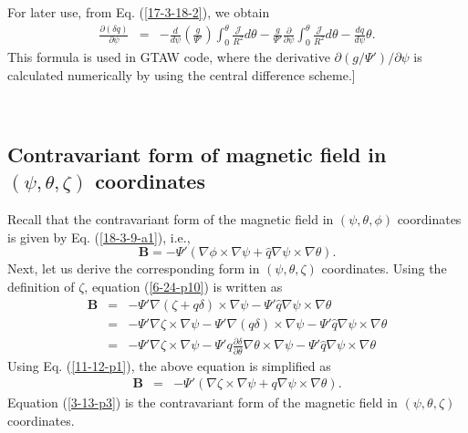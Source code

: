 \documentclass{llncs}
\begin{document}
For later use, from Eq. (\ref{17-3-18-2}), we obtain
\begin{eqnarray}
  \frac{\partial (\delta q)}{\partial \psi} & = & - \frac{d}{d \psi} \left(
  \frac{g}{\Psi'} \right) \int_0^{\theta} \frac{\mathcal{J}}{R^2} d \theta -
  \frac{g}{\Psi'}  \frac{\partial}{\partial \psi} \int_0^{\theta}
  \frac{\mathcal{J}}{R^2} d \theta - \frac{d q}{d \psi} \theta . 
  \label{6-25-a1}
\end{eqnarray}
This formula is used in GTAW code, where the derivative $\partial (g / \Psi')
/ \partial \psi$ is calculated numerically by using the central difference
scheme.]

\

\subsection{ Contravariant form of magnetic field in $(\psi, \theta, \zeta)$
coordinates}\label{6-25-4}

Recall that the contravariant form of the magnetic field in $(\psi, \theta,
\phi)$ coordinates is given by Eq. (\ref{18-3-9-a1}), i.e.,
\begin{equation}
  \label{6-24-p10} \mathbf{B}= - \Psi' (\nabla \phi \times \nabla \psi +
  \hat{q} \nabla \psi \times \nabla \theta) .
\end{equation}
Next, let us derive the corresponding form in $(\psi, \theta, \zeta)$
coordinates. Using the definition of $\zeta$, equation (\ref{6-24-p10}) is
written as
\begin{eqnarray}
  \mathbf{B} & = & - \Psi' \nabla (\zeta + q \delta) \times \nabla \psi -
  \Psi' \hat{q} \nabla \psi \times \nabla \theta \nonumber\\
  & = & - \Psi' \nabla \zeta \times \nabla \psi - \Psi' \nabla (q \delta)
  \times \nabla \psi - \Psi' \hat{q} \nabla \psi \times \nabla \theta
  \nonumber\\
  & = & - \Psi' \nabla \zeta \times \nabla \psi - \Psi' q \frac{\partial
  \delta}{\partial \theta} \nabla \theta \times \nabla \psi - \Psi' \hat{q}
  \nabla \psi \times \nabla \theta 
\end{eqnarray}
Using Eq. (\ref{11-12-p1}), the above equation is simplified as
\begin{eqnarray}
  \label{18-8-22-p1} \mathbf{B} & = & - \Psi' (\nabla \zeta \times \nabla \psi
  + q \nabla \psi \times \nabla \theta) .  \label{3-13-p3}
\end{eqnarray}
Equation (\ref{3-13-p3}) is the contravariant form of the magnetic field in
$(\psi, \theta, \zeta)$ coordinates.
\end{document}
